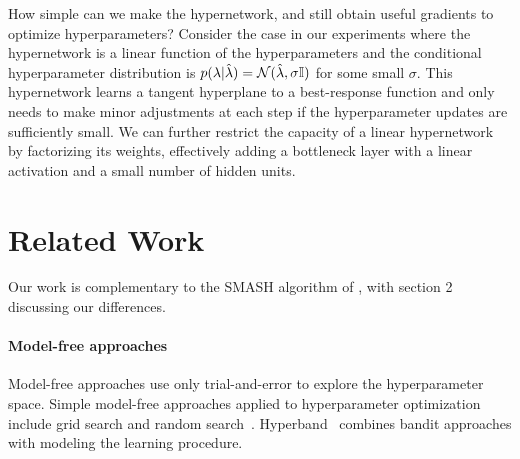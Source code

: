 \documentclass{article} %
\newcommand{\param}{\mathrm{w}} %
\newcommand{\hyper}{\lambda} %
\newcommand{\responseParam}{\phi} %
\newcommand{\approxResponseSymbol}[1]{\param_{#1}} %
\newcommand{\approxResponse}[2]{\approxResponseSymbol{#2} ( #1 )} %
\newcommand{\sampleRename}[1]{#1} %
\newcommand{\curRename}[1]{\smash{\hat{#1}}} %
\newcommand{\hyperDistVar}{p ( \sampleRename{\hyper} | \curRename{\hyper} )} %
\newcommand{\phyper}{p \left( \hyper \right)}
\begin{document}
How simple can we make the hypernetwork, and still obtain useful gradients to optimize hyperparameters?
Consider the case in our experiments where the hypernetwork is a linear function of the hyperparameters and the conditional hyperparameter distribution is $\hyperDistVar = \mathcal{N} ( \curRename{\hyper}, \sigma \mathbb{I} )$ for some small $\sigma$.
This hypernetwork learns a tangent hyperplane to a best-response function and only needs to make minor adjustments at each step if the hyperparameter updates are sufficiently small.
We can further restrict the capacity of a linear hypernetwork by factorizing its weights, effectively adding a bottleneck layer with a linear activation and a small number of hidden units.


\section{Related Work}
Our work is complementary to the SMASH algorithm of \citet{brock2017smash}, with section 2 discussing our differences.

\paragraph{Model-free approaches}
Model-free approaches use only trial-and-error to explore the hyperparameter space.
Simple model-free approaches applied to hyperparameter optimization include grid search and random search~\citep{bergstra2012random}.
Hyperband~\citep{li2016hyperband} combines bandit approaches with modeling the learning procedure.
\end{document}
